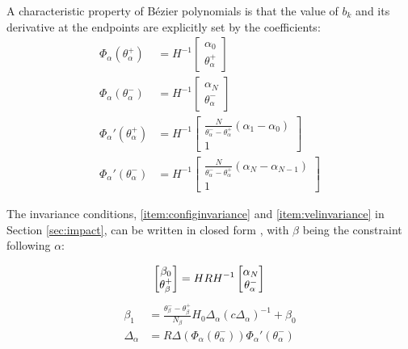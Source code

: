 A characteristic property of Bézier polynomials is that the value of $b_k$ and its derivative at the endpoints are explicitly set by the coefficients:
\begin{subequations}
\begin{align}
	\Phi_\alpha\left(\theta_\alpha^+\right) &= H^{-1}\begin{bmatrix}
		\alpha_0 \\ \theta_\alpha^+
	\end{bmatrix} \\
	\Phi_\alpha\left(\theta_\alpha^-\right) &= H^{-1}\begin{bmatrix}
		\alpha_N \\ \theta_\alpha^-
	\end{bmatrix} \\
	\Phi_\alpha'\left(\theta_\alpha^+\right) &= H^{-1}\begin{bmatrix}
		\frac{N}{\theta_\alpha^- - \theta_\alpha^+}(\alpha_1 - \alpha_0) \\
		1
	\end{bmatrix} \\
	\Phi_\alpha'\left(\theta_\alpha^-\right) &= H^{-1}\begin{bmatrix}
		\frac{N}{\theta_\alpha^- - \theta_\alpha^+}(\alpha_N - \alpha_{N-1}) \\
		1
	\end{bmatrix}
\end{align}
\end{subequations}

The invariance conditions, \ref{item:configinvariance} and \ref{item:velinvariance} in Section \ref{sec:impact}, can be written in closed form \cite{westervelt2007feedback}, with $\beta$ being the constraint following $\alpha$:

\begin{equation} \label{eqn:bezinvconfig}
	\begin{bmatrix}
	 \beta_0 \\ \theta_\beta^+
	\end{bmatrix}
	= HRH^{-1} \begin{bmatrix}
		\alpha_N \\ \theta_\alpha^-
	\end{bmatrix} \\
\end{equation}
\begin{subequations} \label{eqn:bezinvvel}
\begin{align}
	\beta_1 &= \frac{\theta_\beta^- - \theta_\beta^+}{N_\beta}
	H_0\Delta_\alpha \left(c\Delta_\alpha\right)^{-1} + \beta_0\\
	\Delta_\alpha &= R\Delta\left(\Phi_\alpha\left(\theta_\alpha^-\right)\right)
		\Phi_\alpha'\left(\theta_\alpha^-\right) \label{eqn:Delthd}
\end{align}
\end{subequations}

